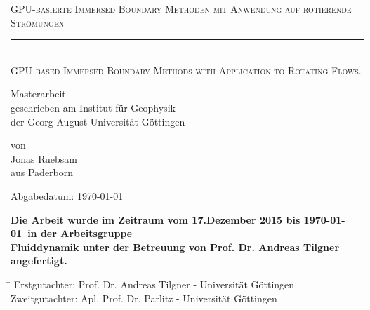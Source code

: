 \documentclass[11pt,a4paper,headsepline,bibliography=totoc,idxtotoc,DIV12,openright,twoside=true,chapterprefix=on]{scrbook}
\begin{document}
\makeatletter
\renewcommand*\env@cases[1][1.2]{%
  \let\@ifnextchar\new@ifnextchar
  \left\lbrace
  \def\arraystretch{#1}%
  \array{@{}l@{\quad}l@{}}%
}
\makeatother

\begin{titlepage}
       \begin{center}
       \begin{huge}
       \textsc{GPU-basierte Immersed Boundary Methoden mit Anwendung auf rotierende Strömungen}
       \rule{0.9\textwidth}{0.4pt}\\
       \textsc{GPU-based Immersed Boundary Methods with Application to Rotating Flows.}\\[1.8cm]
       \end{huge}
       \begin{large}
	Masterarbeit\\[2cm]
	geschrieben am Institut für Geophysik\\
	der Georg-August Universität Göttingen\\[2cm]
       \end{large}
       \begin{large}
       von\\[.5cm]
       Jonas Ruebsam\\
       aus Paderborn\\
       \vfill
       \begin{center}
        \begin{otherlanguage}{ngerman}
       Abgabedatum: \today
        \end{otherlanguage}
       \end{center}
       \end{large}
     \end{center}
\end{titlepage}

\mbox{}
\thispagestyle{empty}
\newpage
\newpage
{}
\thispagestyle{empty}
\vfill
\begin{otherlanguage}{ngerman}
\noindent \textbf{Die Arbeit wurde im Zeitraum vom 17.Dezember 2015 bis \today \ in der Arbeitsgruppe\\ Fluiddynamik
 unter der Betreuung von Prof. Dr. Andreas Tilgner angefertigt. }\\
\end{otherlanguage}

\vfill
\begin{tabbing}
  \hspace{3cm}\=\kill
   Erstgutachter: \quad  Prof. Dr. Andreas Tilgner - Universität Göttingen\\
   Zweitgutachter: \quad  Apl. Prof. Dr. Parlitz - Universität Göttingen\\
\end{tabbing}
\end{document}
